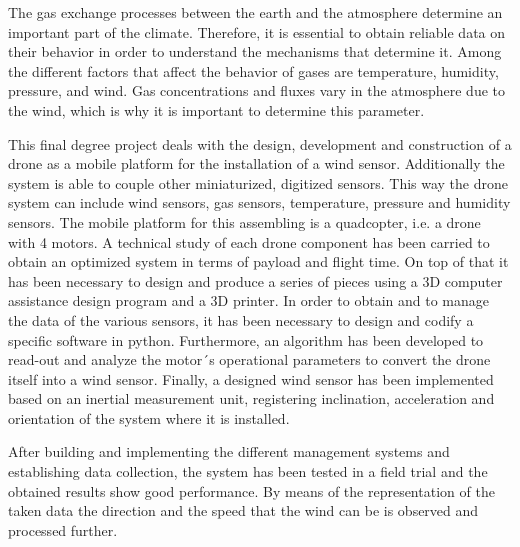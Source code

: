 
The gas exchange processes between the earth and the atmosphere determine an important part of the climate. Therefore, it is essential to obtain reliable data on their behavior in order to understand the mechanisms that determine it. Among the different factors that affect the behavior of gases are temperature, humidity, pressure, and  wind. Gas concentrations and fluxes vary in the atmosphere due to the wind, which is why it is important to determine this parameter.

This final degree project deals with the design, development and construction of a drone as a mobile platform for the installation of a wind sensor. Additionally the system is able to couple other miniaturized, digitized sensors. This way the drone system can include wind sensors, gas sensors, temperature, pressure and humidity sensors. The mobile platform for this assembling is a quadcopter, i.e. a drone with 4 motors. A technical study of each drone component has been carried to obtain an optimized system in terms of payload and flight time. On top of that it has been necessary to design and produce a series of pieces using a 3D computer assistance design program and a 3D printer. In order to obtain and to manage the data of the various sensors, it has been necessary to design and codify a specific software in python. Furthermore, an algorithm has been developed to read-out and analyze the motor´s operational parameters to convert the drone itself into a wind sensor. Finally, a designed wind sensor has been implemented based on an inertial measurement unit, registering inclination, acceleration and orientation of the system where it is installed.

After building and implementing the different management systems and establishing data collection, the system has been tested in a field trial and the obtained results show good performance. By means of the representation of the taken data the direction and the speed that the wind can be is observed and processed further.